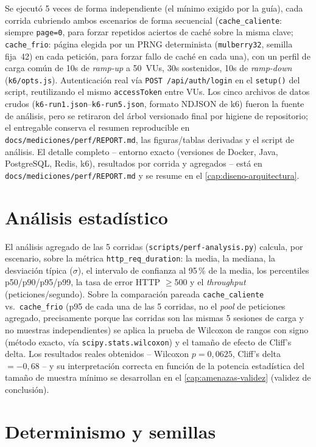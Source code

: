 Se ejecutó 5 veces de forma independiente (el mínimo exigido por la
guía), cada corrida cubriendo ambos escenarios de forma secuencial
(\texttt{cache\_caliente}: siempre \texttt{page=0}, para forzar
repetidos aciertos de caché sobre la misma clave; \texttt{cache\_frio}:
página elegida por un PRNG determinista (\texttt{mulberry32}, semilla
fija~42) en cada petición, para forzar fallo de caché en cada una), con
un perfil de carga común de 10s de \emph{ramp-up} a 50~VUs, 30s
sostenidos, 10s de \emph{ramp-down}
(\texttt{k6/opts.js}). Autenticación real vía \texttt{POST /api/auth/login}
en el \texttt{setup()} del script, reutilizando el mismo
\texttt{accessToken} entre VUs. Los cinco archivos de datos crudos
(\texttt{k6-run1.json}--\texttt{k6-run5.json}, formato NDJSON de k6) fueron
la fuente de análisis, pero se retiraron del árbol versionado final por
higiene de repositorio; el entregable conserva el resumen reproducible en
\texttt{docs/mediciones/perf/REPORT.md}, las figuras/tablas derivadas y el
script de análisis. El detalle completo -- entorno exacto
(versiones de Docker, Java, PostgreSQL, Redis, k6), resultados por
corrida y agregados -- está en \texttt{docs/mediciones/perf/REPORT.md} y
se resume en el \autoref{cap:diseno-arquitectura}.

\section{Análisis estadístico}

El análisis agregado de las 5 corridas (\texttt{scripts/perf-analysis.py})
calcula, por escenario, sobre la métrica \texttt{http\_req\_duration}: la
media, la mediana, la desviación típica ($\sigma$), el intervalo de
confianza al 95\,\% de la media, los percentiles p50/p90/p95/p99, la tasa
de error HTTP $\geq$500 y el \emph{throughput} (peticiones/segundo). Sobre
la comparación pareada \texttt{cache\_caliente} vs.\ \texttt{cache\_frio}
(p95 de cada una de las 5 corridas, no el \emph{pool} de peticiones
agregado, precisamente porque las corridas son las mismas 5 sesiones de
carga y no muestras independientes) se aplica la prueba de Wilcoxon de
rangos con signo (método exacto, vía \texttt{scipy.stats.wilcoxon}) y el
tamaño de efecto de Cliff's delta. Los resultados reales obtenidos --
Wilcoxon $p=0{,}0625$, Cliff's delta $=-0{,}68$ -- y su interpretación
correcta en función de la potencia estadística del tamaño de muestra
mínimo se desarrollan en el \autoref{cap:amenazas-validez} (validez de
conclusión).

\section{Determinismo y semillas}
\label{sec:mm-semillas}

